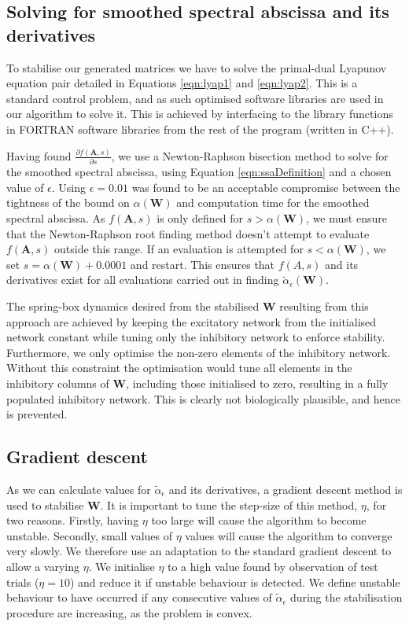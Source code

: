 \documentclass[12pt, a4paper]{article}
\begin{document}
\FloatBarrier
\subsection{Solving for smoothed spectral abscissa and its derivatives}

To stabilise our generated matrices we have to solve the primal-dual Lyapunov equation pair detailed in Equations \ref{eqn:lyap1} and \ref{eqn:lyap2}.  This is a standard control problem, and as such optimised software libraries are used in our algorithm to solve it.  This is achieved by interfacing to the library functions in FORTRAN software libraries from the rest of the program (written in C++).

Having found $\frac{\partial f(\mathbf{A},s)}{\partial s}$, we use a Newton-Raphson bisection method to solve for the smoothed spectral abscissa, using Equation \ref{eqn:ssaDefinition} and a chosen value of $\epsilon$.  Using $\epsilon = 0.01$ was found to be an acceptable compromise between the tightness of the bound on $\alpha(\mathbf{W})$ and computation time for the smoothed spectral abscissa.  As $f(\mathbf{A},s)$ is only defined for $s > \alpha(\mathbf{W})$, we must ensure that the Newton-Raphson root finding method doesn't attempt to evaluate $f(\mathbf{A},s)$ outside this range.  If an evaluation is attempted for $s < \alpha(\mathbf{W})$, we set $s = \alpha(\mathbf{W}) + 0.0001$ and restart.  This ensures that $f(A,s)$ and its derivatives exist for all evaluations carried out in finding $\tilde{\alpha}_\epsilon(\mathbf{W})$.

The spring-box dynamics desired from the stabilised $\mathbf{W}$ resulting from this approach are achieved by keeping the excitatory network from the initialised network constant while tuning only the inhibitory network to enforce stability\cite{HennequinSubmitted}.  Furthermore, we only optimise the non-zero elements of the inhibitory network.  Without this constraint the optimisation would tune all elements in the inhibitory columns of $\mathbf{W}$, including those initialised to zero, resulting in a fully populated inhibitory network.  This is clearly not biologically plausible, and hence is prevented.


\FloatBarrier
\subsection{Gradient descent}
As we can calculate values for $\tilde{\alpha}_\epsilon$ and its derivatives, a gradient descent method is used to stabilise $\mathbf{W}$.  It is important to tune the step-size of this method, $\eta$, for two reasons.  Firstly, having $\eta$ too large will cause the algorithm to become unstable.  Secondly, small values of $\eta$ values will cause the algorithm to converge very slowly.  We therefore use an adaptation to the standard gradient descent to allow a varying $\eta$.  We initialise $\eta$ to a high value found by observation of test trials ($\eta = 10$) and reduce it if unstable behaviour is detected.  We define unstable behaviour to have occurred if any consecutive values of $\tilde{\alpha}_\epsilon$ during the stabilisation procedure are increasing, as the problem is convex.
 
\end{document}
